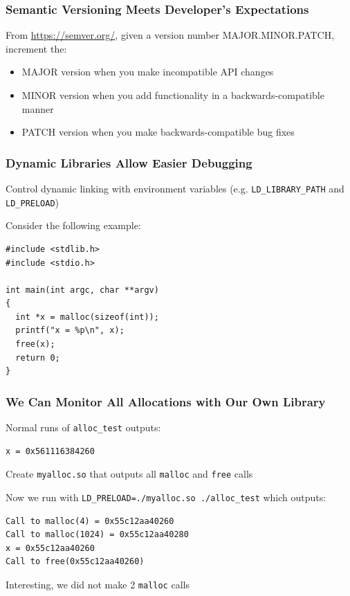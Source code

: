 \documentclass[aspectratio=169]{beamer}
\begin{document}
  \begin{frame}
    \frametitle{Semantic Versioning Meets Developer's Expectations}

    From \url{https://semver.org/}, given a version number MAJOR.MINOR.PATCH,
    increment the:

    \begin{itemize}
      \item MAJOR version when you make incompatible API changes
      \item MINOR version when you add functionality in a backwards-compatible
            manner
      \item PATCH version when you make backwards-compatible bug fixes
    \end{itemize}
  \end{frame}

  \begin{frame}[fragile]
    \frametitle{Dynamic Libraries Allow Easier Debugging}

    Control dynamic linking with environment variables (e.g.
    \texttt{LD\_LIBRARY\_PATH} and \texttt{LD\_PRELOAD})

    \vspace{2em}

    Consider the following example:
    \begin{lstlisting}[basicstyle=\small\ttfamily]
#include <stdlib.h>
#include <stdio.h>

int main(int argc, char **argv)
{
  int *x = malloc(sizeof(int));
  printf("x = %p\n", x);
  free(x);
  return 0;
}
    \end{lstlisting}
  \end{frame}

  \begin{frame}[fragile]
    \frametitle{We Can Monitor All Allocations with Our Own Library}

    Normal runs of \texttt{alloc\_test} outputs:
    \begin{lstlisting}[basicstyle=\small\ttfamily]
x = 0x561116384260
    \end{lstlisting}

    \vspace{1em}

    Create \texttt{myalloc.so} that outputs all \texttt{malloc} and
    \texttt{free} calls

    \vspace{1em}

    Now we run with \texttt{LD\_PRELOAD=./myalloc.so  ./alloc\_test} which
    outputs:
    \begin{lstlisting}[basicstyle=\small\ttfamily]
Call to malloc(4) = 0x55c12aa40260                  
Call to malloc(1024) = 0x55c12aa40280
x = 0x55c12aa40260
Call to free(0x55c12aa40260)
    \end{lstlisting}

    \vspace{1em}

    Interesting, we did not make 2 \texttt{malloc} calls
  \end{frame}
\end{document}
